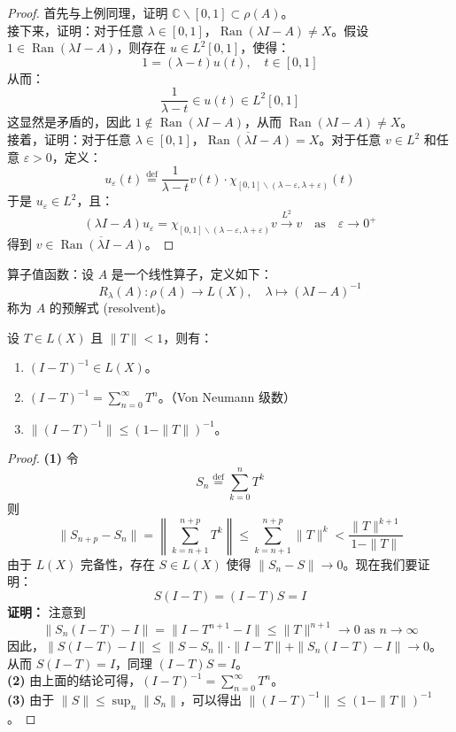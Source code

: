 \documentclass[lang=cn,newtx,10pt,scheme=chinese,thmcnt=chapter]{elegantbook}
\begin{document}
\begin{proof}
首先与上例同理，证明 $\mathbb{C} \backslash [0,1] \subset \rho(A)$。\\
接下来，证明：对于任意 $\lambda \in [0,1]$，$\operatorname{Ran}(\lambda I - A) \neq X$。假设 $1 \in \operatorname{Ran}(\lambda I - A)$，则存在 $u \in L^2[0,1]$，使得：
\[
1 = (\lambda - t) u(t), \quad t \in [0,1]
\]
从而：
\[
\frac{1}{\lambda - t} \in u(t) \in L^2[0,1]
\]
这显然是矛盾的，因此 $1 \notin \operatorname{Ran}(\lambda I - A)$，从而 $\operatorname{Ran}(\lambda I - A) \neq X$。\\
接着，证明：对于任意 $\lambda \in [0,1]$，$\overline{\operatorname{Ran}(\lambda I - A) }=X$。对于任意 $v \in L^2$ 和任意 $\varepsilon > 0$，定义：
\[
u_{\varepsilon}(t) \stackrel{\text{def}}{=} \frac{1}{\lambda - t} v(t) \cdot \chi_{[0,1] \backslash (\lambda - \varepsilon, \lambda + \varepsilon)}(t)
\]
于是 $u_{\varepsilon} \in L^2$，且：
\[
(\lambda I - A) u_{\varepsilon} = \chi_{[0,1] \backslash (\lambda - \varepsilon, \lambda + \varepsilon)} v \xrightarrow{L^2} v \quad \text{as} \quad \varepsilon \to 0^+
\]
得到 $v \in \overline{\operatorname{Ran}(\lambda I - A)}$。

\end{proof}

\begin{definition}
算子值函数：设 $A$ 是一个线性算子，定义如下：
\[
R_\lambda(A): \rho(A) \rightarrow L(X), \quad \lambda \mapsto (\lambda I - A)^{-1}
\]
称为 $A$ 的预解式 (resolvent)。
\end{definition}

\begin{lemma}
设 $T \in L(X)$ 且 $\|T\| < 1$，则有：
\begin{enumerate}
    \item $(I - T)^{-1} \in L(X)$。
    \item $(I - T)^{-1} = \sum_{n=0}^{\infty} T^n$。（Von Neumann 级数）
    \item $\| (I - T)^{-1} \| \leqslant (1 - \|T\|)^{-1}$。
\end{enumerate}
\end{lemma}

\begin{proof}
\textbf{(1)} 令
\[
S_n \stackrel{\text{def}}{=} \sum_{k=0}^n T^k
\]
则
\[
\| S_{n+p} - S_n \| = \left\| \sum_{k=n+1}^{n+p} T^k \right\| \leqslant \sum_{k=n+1}^{n+p} \| T \|^k < \frac{\| T \|^{k+1}}{1 - \| T \|}
\]
由于 $L(X)$ 完备性，存在 $S \in L(X)$ 使得 $\| S_n - S \| \to 0$。现在我们要证明：
\[
S (I - T) = (I - T) S = I
\]
\textbf{证明：} 注意到
\[
\| S_n (I - T) - I \| = \| I - T^{n+1} - I \| \leqslant \| T \|^{n+1} \to 0 \text{ as } n \to \infty
\]
因此，$\| S (I - T) - I \| \leqslant \| S - S_n \| \cdot \| I - T \| + \| S_n (I - T) - I \| \to 0$。从而 $S (I - T) = I$，同理 $(I - T) S = I$。\\
\textbf{(2)} 由上面的结论可得，$(I - T)^{-1} = \sum_{n=0}^{\infty} T^n$。\\
\textbf{(3)} 由于 $\| S \| \leqslant \sup_n \| S_n \|$，可以得出 $\| (I - T)^{-1} \| \leqslant (1 - \| T \|)^{-1}$。
\end{proof}
\end{document}
